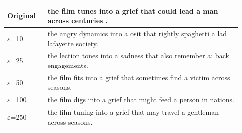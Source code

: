 \begin{tabular}{@{}p{0.16\linewidth}p{0.77\linewidth}@{}}
\toprule
Original & the film tunes into a grief that could lead a man across centuries .  \\
\midrule
$\varepsilon$=10 & the angry dynamics into a osit that rightly spaghetti a lad lafayette society. \\
$\varepsilon$=25 & the lection tones into a sadness that also remember a: back engagements. \\
$\varepsilon$=50 & the film fits into a grief that sometimes find a victim across seasons. \\
$\varepsilon$=100 & the film digs into a grief that might feed a person in nations. \\
$\varepsilon$=250 & the film tuning into a grief that may travel a gentleman across seasons. \\
\bottomrule
\end{tabular}
